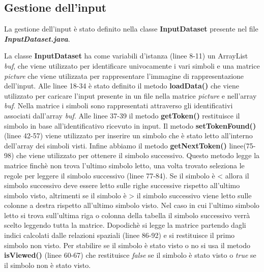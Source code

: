 \subsection{Gestione dell'input}
La gestione dell'input è stato definito nella classe \textbf{InputDataset} presente nel file \textbf{\textit{InputDataset.java}}.

La classe \textbf{InputDataset} ha come variabili d'istanza (linee 8-11) un ArrayList \textit{buf}, che viene utilizzato per identificare univocamente i vari simboli e una matrice \textit{picture} che viene utilizzata per rappresentare l'immagine di rappresentazione dell'input. Alle linee 18-34 è stato definito il metodo \textbf{loadData()} che viene utilizzato per caricare l'input presente in un file nella matrice \textit{picture} e nell'array \textit{buf}. Nella matrice i simboli sono rappresentati attraverso gli identificativi associati dall'array \textit{buf}. Alle linee 37-39 il metodo \textbf{getToken()} restituisce il simbolo in base all'identificativo ricevuto in input. Il metodo \textbf{setTokenFound()} (linee 42-57) viene utilizzato per inserire un simbolo che è stato letto all'interno dell'array dei simboli visti. Infine abbiamo il metodo \textbf{getNextToken()} linee(75-98) che viene utilizzato per ottenere il simbolo successivo. Questo metodo legge la matrice finchè non trova l'ultimo simbolo letto, una volta trovato seleziona le regole per leggere il simbolo successivo (linee 77-84). Se il simbolo è < allora il simbolo successivo deve essere letto sulle righe successive rispetto all'ultimo simbolo visto, altrimenti se il simbolo è > il simbolo successivo viene letto sulle colonne a destra rispetto all'ultimo simbolo visto. Nel caso in cui l'ultimo simbolo letto si trova sull'ultima riga o colonna della tabella il simbolo successivo verrà scelto leggendo tutta la matrice. Dopodichè si legge la matrice partendo dagli indici calcolati dalle relazioni spaziali (linee 86-92) e si restituisce il primo simbolo non visto. Per stabilire se il simbolo è stato visto o no si usa il metodo \textbf{isViewed()} (linee 60-67) che restituisce \textit{false} se il simbolo è stato visto o \textit{true} se il simbolo non è stato visto.
